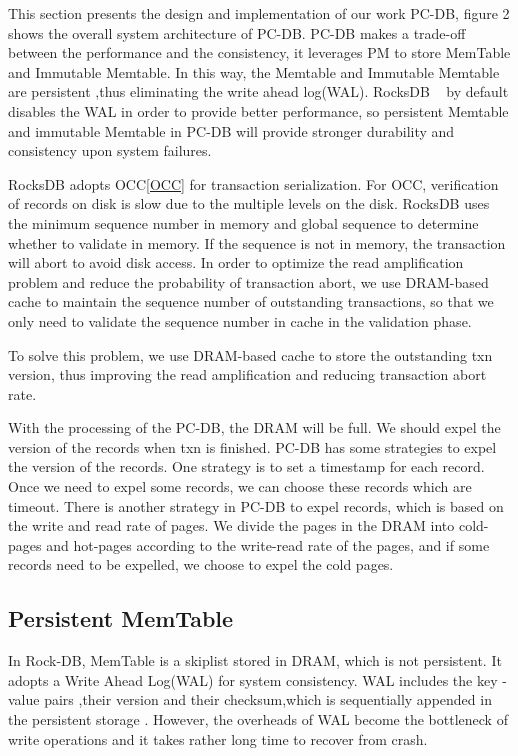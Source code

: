 \sectio
This section presents the design and implementation of our work PC-DB, figure 2 shows the overall system architecture of PC-DB. 
PC-DB makes a trade-off between the performance and the consistency, it leverages PM to  store MemTable and Immutable Memtable. 
In this way, the Memtable and Immutable Memtable are persistent ,thus eliminating the write ahead log(WAL). 
RocksDB ~\cite{RocksDB} by default disables the WAL in order to provide better performance, 
so persistent Memtable and immutable Memtable in PC-DB will provide stronger durability and consistency upon system failures.

RocksDB adopts OCC\ref{OCC} for transaction serialization.
For OCC, verification of records on disk is slow due to the multiple levels on the disk. 
RocksDB uses the minimum sequence number in memory and global sequence to determine whether to validate in memory. 
If the sequence is not in memory, the transaction will abort to avoid disk access. 
In order to optimize the read amplification problem and reduce the probability of transaction abort, 
we use DRAM-based cache to maintain the sequence number of outstanding transactions, 
so that we only need to validate the sequence number in cache in the validation phase.

 To solve this problem, we use DRAM-based cache to store the outstanding txn version, 
 thus improving the read amplification and reducing transaction abort rate.

With the processing of the PC-DB, the DRAM will be full. We should expel the version of the records when txn is finished. 
PC-DB has some strategies to expel the version of the records. One strategy is to set a timestamp for each record. Once we need to expel some records, we can choose these records which are timeout. 
There is another strategy in PC-DB to expel records, which is based on the write and read rate of pages. 
We divide the pages in the DRAM into cold-pages and hot-pages according to the write-read rate of the pages, and if some records need to be expelled, we choose to expel the cold pages.

\subsection{Persistent MemTable}
In Rock-DB, MemTable is a skiplist stored in DRAM, which is not persistent. It adopts a Write Ahead Log(WAL) for system consistency. WAL includes the key -value pairs ,their version and their checksum,which is sequentially appended in the persistent storage . 
However, the overheads of WAL become the bottleneck of write operations and it takes rather long time to recover from crash. 

